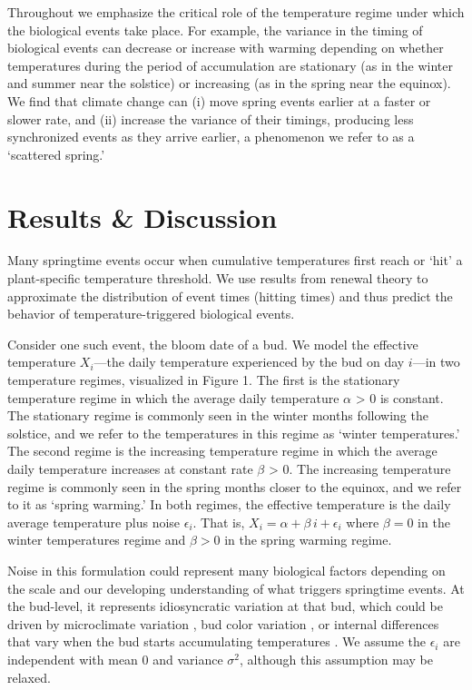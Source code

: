 \documentclass[
]{article}
\begin{document}
Throughout we emphasize the critical role of the temperature regime under which the biological events take place. For example, the variance in the timing of biological events can decrease or increase with warming depending on whether temperatures during the period of accumulation are stationary (as in the winter and summer near the solstice) or increasing (as in the spring near the equinox). We find that climate change can (i) move spring events earlier at a faster or slower rate, and (ii) increase the variance of their timings, producing less synchronized events as they arrive earlier, a phenomenon we refer to as a `scattered spring.' 

\section{Results \& Discussion}\label{resultsdiscuss}

Many springtime events occur when cumulative temperatures first reach or `hit' a plant-specific temperature threshold. We use results from renewal theory  \citep{siegmund1967some,  woodroofe1982nonlinear, gut2009stopped} to approximate the distribution of event times (hitting times) and thus predict the behavior of temperature-triggered biological events. %

Consider one such event, the bloom date of a bud. We model the effective temperature $X_i$---the daily temperature experienced by the bud on day $i$---in two temperature regimes, visualized in Figure 1. The first is the stationary temperature regime in which the average daily temperature $\alpha$ > 0 is constant. The stationary regime is commonly seen in the winter months following the solstice, and we refer to the temperatures in this regime as `winter temperatures.' The second regime is the increasing temperature regime in which the average daily temperature increases at constant rate $\beta$ > 0. The increasing temperature regime is commonly seen in the spring months closer to the equinox,  and we refer to it as `spring warming.' In both regimes, the effective temperature is the daily average temperature plus noise $\epsilon_i$. That is, $X_i = \alpha + \beta \, i +  \epsilon_i$ where $\beta = 0$ in the winter temperatures regime and $\beta > 0$ in the spring warming regime.

Noise in this formulation could represent many biological factors depending on the scale and our developing understanding of what triggers springtime events. At the bud-level, it represents idiosyncratic variation at that bud, which could be driven by microclimate variation \citep{schwartz2014separating}, bud color variation \citep{peaucelle2022accurate}, or internal differences that vary when the bud starts accumulating temperatures \citep{vanderschoot2014, pan2023epigenetic}. We assume the $\epsilon_i$ are independent with mean $0$ and variance $\sigma^2$, although this assumption may be relaxed.
\end{document}
